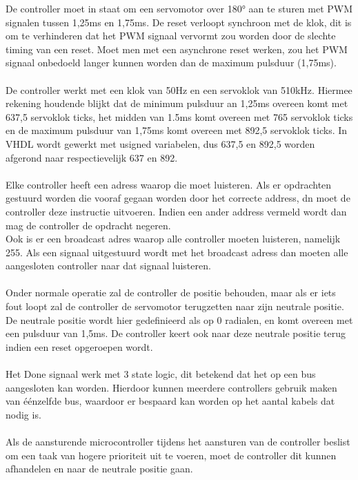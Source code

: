 De controller moet in staat om een servomotor over 180° aan te sturen met PWM signalen tussen 1,25ms en 1,75ms. De reset verloopt synchroon met de klok, dit is om te verhinderen dat het PWM signaal vervormt zou worden door de slechte timing van een reset. Moet men met een asynchrone reset werken, zou het PWM signaal onbedoeld langer kunnen worden dan de maximum pulsduur (1,75ms).\\
\\
De controller werkt met een klok van 50Hz en een servoklok van 510kHz. Hiermee rekening houdende blijkt dat de minimum pulsduur an 1,25ms overeen komt met 637,5 servoklok ticks, het midden van 1.5ms komt overeen met 765 servoklok ticks en de maximum pulsduur van 1,75ms komt overeen met 892,5 servoklok ticks. In VHDL wordt gewerkt met usigned variabelen, dus 637,5 en 892,5 worden afgerond naar respectievelijk 637 en 892.\\
\\
Elke controller heeft een adress waarop die moet luisteren. Als er opdrachten gestuurd worden die vooraf gegaan worden door het correcte address, dn moet de controller deze instructie uitvoeren. Indien een ander address vermeld wordt dan mag de controller de opdracht negeren.\\
Ook is er een broadcast adres waarop alle controller moeten luisteren, namelijk 255. Als een signaal uitgestuurd wordt met het broadcast adress dan moeten alle aangesloten controller naar dat signaal luisteren.\\
\\
Onder normale operatie zal de controller de positie behouden, maar als er iets fout loopt zal de controller de servomotor terugzetten naar zijn neutrale positie. De neutrale positie wordt hier gedefinieerd als op 0 radialen, en komt overeen met een pulsduur van 1,5ms. De controller keert ook naar deze neutrale positie terug indien een reset opgeroepen wordt.\\
\\
Het Done signaal werk met 3 state logic, dit betekend dat het op een bus aangesloten kan worden. Hierdoor kunnen meerdere controllers gebruik maken van éénzelfde bus, waardoor er bespaard kan worden op het aantal kabels dat nodig is.\\
\\
Als de aansturende microcontroller tijdens het aansturen van de controller beslist om een taak van hogere prioriteit uit te voeren, moet de controller dit kunnen afhandelen en naar de neutrale positie gaan.\\
